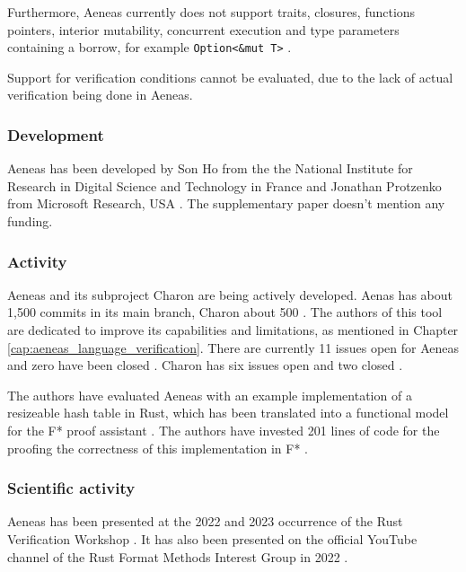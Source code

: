 Furthermore, Aeneas currently does not support traits, closures, functions pointers, interior mutability, concurrent execution and type parameters containing a borrow, for example \lstinline{Option<&mut T>} \cite{ho_aeneas_2022,aeneasverif_aeneasverifaeneas_2023}.

Support for verification conditions cannot be evaluated, due to the lack of actual verification being done in Aeneas.

\subsubsection{Development}

Aeneas has been developed by Son Ho from the the National Institute for Research in Digital Science and Technology in France and Jonathan Protzenko from Microsoft Research, USA \cite{ho_aeneas_2022}. The supplementary paper \cite{ho_aeneas_2022} doesn't mention any funding. 

\subsubsection{Activity}

Aeneas and its subproject Charon are being actively developed. Aenas \cite{aeneasverif_aeneasverifaeneas_2023} has about 1,500 commits in its main branch, Charon about 500 \cite{aeneasverif_aeneasverifcharon_2023}. The authors of this tool are dedicated to improve its capabilities and limitations, as mentioned in Chapter \ref{cap:aeneas_language_verification}. There are currently 11 issues open for Aeneas and zero have been closed \cite{aeneasverif_issues_2023-1}. Charon has six issues open and two closed \cite{aeneasverif_issues_2023}.

The authors have evaluated Aeneas with an example implementation of a resizeable hash table in Rust, which has been translated into a functional model for the F* proof assistant \cite{ho_aeneas_2022}. The authors have invested 201 lines of code for the proofing the correctness of this implementation in F* \cite{ho_aeneas_2022}. 

\subsubsection{Scientific activity}

Aeneas has been presented at the 2022 and 2023 occurrence of the Rust Verification Workshop \cite{peter_muller_rust_2022,peter_muller_rust_2023}. It has also been presented on the official YouTube channel of the Rust Format Methods Interest Group in 2022 \cite{rust_formal_methods_ig_aeneas_2022}.

